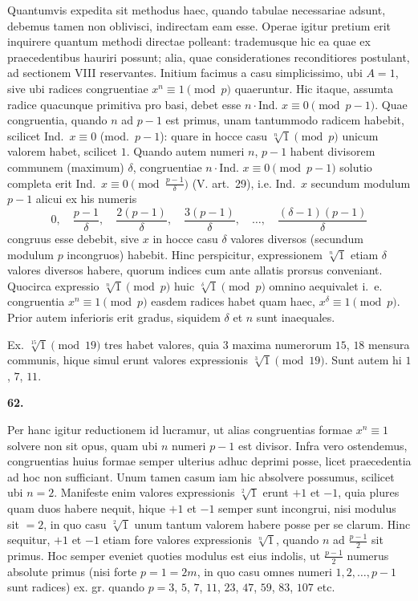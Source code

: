 \documentclass[12pt,a4paper]{article}
\theoremstyle{plain}
\theoremstyle{definition}
\theoremstyle{remark}
\begin{document}
Quantumvis expedita sit methodus haec, quando tabulae necessariae adsunt, debemus tamen non oblivisci, indirectam eam esse. Operae igitur pretium erit inquirere quantum methodi directae polleant: trademusque hic ea quae ex praecedentibus hauriri possunt; alia, quae considerationes reconditiores postulant, ad sectionem VIII reservantes. Initium facimus a casu simplicissimo, ubi $A=1$, sive ubi radices congruentiae $x^n \equiv 1 \pmod{p}$ quaeruntur. Hic itaque, assumta radice quacunque primitiva pro basi, debet esse $n \cdot \text{Ind. } x \equiv 0 \pmod{p-1}$. Quae congruentia, quando $n$ ad $p-1$ est primus, unam tantummodo radicem habebit, scilicet Ind.~$x \equiv 0$ (mod.~$p-1$): quare in hocce casu $\sqrt[n]{1} \pmod{p}$ unicum valorem habet, scilicet $1$. Quando autem numeri $n$, $p-1$ habent divisorem communem (maximum) $\delta$, congruentiae $n \cdot \text{Ind. } x \equiv 0 \pmod{p-1}$ solutio completa erit Ind.~$x \equiv 0 \pmod{\frac{p-1}{\delta}}$ (V. art.~29), i.e. Ind.~$x$ secundum modulum $p-1$ alicui ex his numeris
\[0, \quad \frac{p-1}{\delta}, \quad \frac{2(p-1)}{\delta}, \quad \frac{3(p-1)}{\delta}, \quad \ldots, \quad \frac{(\delta-1)(p-1)}{\delta}\]
congruus esse debebit, sive $x$ in hocce casu $\delta$ valores diversos (secundum modulum $p$ incongruos) habebit. Hinc perspicitur, expressionem $\sqrt[n]{1}$ etiam $\delta$ valores diversos habere, quorum indices cum ante allatis prorsus conveniant. Quocirca expressio $\sqrt[n]{1} \pmod{p}$ huic $\sqrt[\delta]{1} \pmod{p}$ omnino aequivalet i.~e. congruentia $x^n \equiv 1 \pmod{p}$ easdem radices habet quam haec, $x^\delta \equiv 1 \pmod{p}$. Prior autem inferioris erit gradus, siquidem $\delta$ et $n$ sunt inaequales.

Ex. $\sqrt[15]{1} \pmod{19}$ tres habet valores, quia $3$ maxima numerorum $15$, $18$ mensura communis, hique simul erunt valores expressionis $\sqrt[3]{1} \pmod{19}$. Sunt autem hi $1$, $7$, $11$.

\setcounter{satz}{62}
\addtocounter{satz}{-1}
\textbf{62.}

Per hanc igitur reductionem id lucramur, ut alias congruentias formae $x^n \equiv 1$ solvere non sit opus, quam ubi $n$ numeri $p-1$ est divisor. Infra vero ostendemus, congruentias huius formae semper ulterius adhuc deprimi posse, licet praecedentia ad hoc non sufficiant. Unum tamen casum iam hic absolvere possumus, scilicet ubi $n=2$. Manifeste enim valores expressionis $\sqrt[2]{1}$ erunt $+1$ et $-1$, quia plures quam duos habere nequit, hique $+1$ et $-1$ semper sunt incongrui, nisi modulus sit $=2$, in quo casu $\sqrt[2]{1}$ unum tantum valorem habere posse per se clarum. Hinc sequitur, $+1$ et $-1$ etiam fore valores expressionis $\sqrt[n]{1}$, quando $n$ ad $\frac{p-1}{2}$ sit primus. Hoc semper eveniet quoties modulus est eius indolis, ut $\frac{p-1}{2}$ numerus absolute primus (nisi forte $p=1=2m$, in quo casu omnes numeri $1, 2, \ldots, p-1$ sunt radices) ex. gr. quando $p=3$, $5$, $7$, $11$, $23$, $47$, $59$, $83$, $107$ etc.
\end{document}
